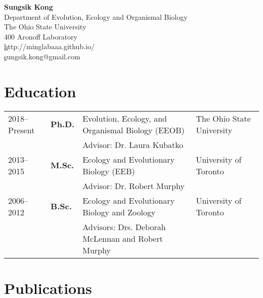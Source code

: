 \documentclass[11pt]{article}
\begin{document}
\pagestyle{plain}

\begin{center}
\huge \textbf{Sungsik Kong}\\
\vspace{0.2cm}
\large Department of Evolution, Ecology and Organismal Biology\\
\large The Ohio State University\\
\large 400 Aronoff Laboratory\\
\small \href{http://minglabaaa.github.io}http://minglabaaa.github.io/\\
\small \href{mailto:sungsik.kong@gmail.com}sungsik.kong@gmail.com
\end{center}







\section*{Education}

\begin{longtable}{p{}  p{} p{} p{}}
2018--Present & \textbf{Ph.D.} & Evolution, Ecology, and Organismal Biology (EEOB) & The Ohio State University\\
 & & Advisor: Dr. Laura Kubatko\\
2013--2015 & \textbf{M.Sc.} & Ecology and Evolutionary Biology (EEB) & University of Toronto\\
 & & Advisor: Dr. Robert Murphy\\
2006--2012 & \textbf{B.Sc.} & Ecology and Evolutionary Biology and Zoology & University of Toronto\\
 & & Advisors: Drs. Deborah McLennan and Robert Murphy
\end{longtable}



\hspace{0pt}



\section*{Publications}
\end{document}
